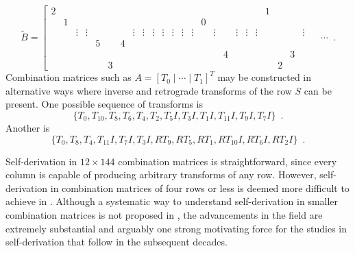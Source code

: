 \begin{example}
	\begin{equation}
    	\tilde{B} = \left[
    	\begin{array}{cccccccccccc|cccccccccccc|}
        	2 &&&&&&&&&&&&&&&&&&&& 1 &&& \\
        	& 1 &&&&&&&&&&&&& 0 &&&&&&&&& \\
        	&& \vdots & \vdots &&&& \vdots & \vdots & \vdots & \vdots & \vdots & \vdots & \vdots && \vdots && \vdots & \vdots & \vdots &&&& \vdots \\
        	&&&& 5 && \boxed{4} &&&&&&&&&&&&&&&&& \\
        	&&&&&&&&&&&&&&&& \boxed{4} &&&&&& 3 & \\
        	&&&&& 3 &&&&&&&&&&&&&&&& 2 &&
    	\end{array}
    	\; \quad \cdots \right. \enspace.
    \end{equation}
    Combination matrices such as $A = [T_0 \; | \; \cdots \; | \; T_1]^T$ may be constructed in alternative ways where inverse and retrograde transforms of the row $S$ can be present. One possible sequence of transforms is
	\begin{equation}
		\{ T_0, T_{10}, T_{8}, T_{6}, T_{4}, T_{2}, T_{5}I, T_{3}I, T_{1}I, T_{11}I, T_{9}I, T_{7}I \} \enspace .
	\end{equation}
	Another is
	\begin{equation}
		\{ T_0, T_{8}, T_{4}, T_{11}I, T_{7}I, T_{3}I, RT_{9}, RT_{5}, RT_{1}, RT_{10}I, RT_{6}I, RT_{2}I \} \enspace .
	\end{equation}
\end{example}

Self-derivation in $12 \times 144$ combination matrices is straightforward, since every column is capable of producing arbitrary transforms of any row. However, self-derivation in combination matrices of four rows or less is deemed more difficult to achieve in \cite[108]{Westergaard1966}. Although a systematic way to understand self-derivation in smaller combination matrices is not proposed in \cite{Westergaard1966}, the advancements in the field are extremely substantial and arguably one strong motivating force for the studies in self-derivation that follow in the subsequent decades.


